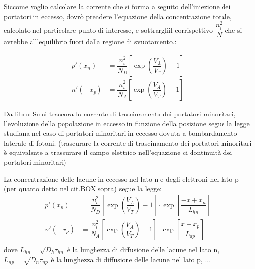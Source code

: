 Siccome voglio calcolare la corrente che si forma a seguito dell'iniezione dei portatori in eccesso, dovrò prendere l'equazione della concentrazione totale, calcolato nel particolare punto di interesse, e sottrargliil corrispettivo $\dfrac{n_i^2}{N}$ che si avrebbe all'equilibrio fuori dalla regione di svuotamento.:

\begin{align}
    p'(x_n)&=\dfrac{n_i^2}{N_D} \left[ \exp\left( \dfrac{V_A}{V_T}\right) -1 \right]\\
    n'(-x_p)&=\dfrac{n_i^2}{N_A} \left[\exp\left( \dfrac{V_A}{V_T}\right) -1 \right]
\end{align}
\begin{psbox}[Proseguendo..]
    Da libro: Se si trascura la corrente di trascinamento dei portatori minoritari, l'evoluzione della popolazione in eccesso in funzione della posizione segue la legge studiana nel caso di portatori minoritari in eccesso dovuta a bombardamento laterale di fotoni. (trascurare la corrente di trascinamento dei portatori minoritari è equivalente a trascurare il campo elettrico nell'equazione ci dontinuità dei portatori minoritari)
\end{psbox}
La concentrazione delle lacune in eccesso nel lato n e degli elettroni nel lato p (per quanto detto nel cit.BOX sopra) segue la legge:
\begin{align}
    p'(x_n)&=\dfrac{n_i^2}{N_D} \left[ \exp\left( \dfrac{V_A}{V_T}\right) -1 \right] \cdot \exp \left[\dfrac{-x+x_n}{L_{hn}} \right]\\
    n'(-x_p)&=\dfrac{n_i^2}{N_A} \left[\exp\left( \dfrac{V_A}{V_T}\right) -1 \right]\cdot \exp \left[\dfrac{x+x_p}{L_{np}} \right]\\
\end{align}
dove $L_{hn}=\sqrt{D_h\tau_{hn}}$ è la lunghezza di diffusione delle lacune nel lato n,
$L_{np}=\sqrt{D_n\tau_{np}}$ è la lunghezza di diffusione delle lacune nel lato p,
...

